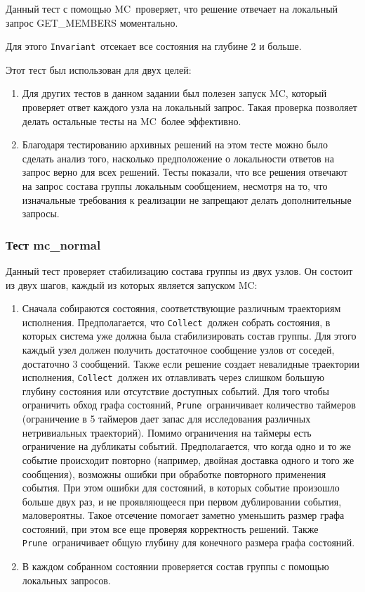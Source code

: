 \documentclass[a4paper,12pt]{extarticle}
\newcommand{\prune}[0]{\texttt{Prune}}
\newcommand{\invariant}[0]{\texttt{Invariant}}
\newcommand{\collect}[0]{\texttt{Collect}}
\newcommand{\mc}[0]{MC}
\begin{document}
Данный тест с помощью \mc\ проверяет, что решение отвечает на локальный запрос GET\_MEMBERS моментально.

Для этого \invariant\ отсекает все состояния на глубине 2 и больше.

Этот тест был использован для двух целей:
\begin{enumerate}
    \item Для других тестов в данном задании был полезен запуск \mc, который проверяет ответ каждого узла на локальный запрос.
Такая проверка позволяет делать остальные тесты на \mc\ более эффективно.
    \item Благодаря тестированию архивных решений на этом тесте можно было сделать анализ того, насколько предположение о локальности ответов на запрос верно для всех решений.
Тесты показали, что все решения отвечают на запрос состава группы локальным сообщением, несмотря на то, что изначальные требования к реализации не запрещают делать дополнительные запросы.
\end{enumerate}

\subsubsection{Тест mc\_normal}

Данный тест проверяет стабилизацию состава группы из двух узлов.
Он состоит из двух шагов, каждый из которых является запуском \mc:
\begin{enumerate}
    \item Сначала собираются состояния, соответствующие различным траекториям исполнения.
Предполагается, что \collect\ должен собрать состояния, в которых система уже должна была стабилизировать состав группы.
Для этого каждый узел должен получить достаточное сообщение узлов от соседей, достаточно 3 сообщений.
Также если решение создает невалидные траектории исполнения, \collect\ должен их отлавливать через слишком большую глубину состояния или отсутствие доступных событий.
Для того чтобы ограничить обход графа состояний, \prune\ ограничивает количество таймеров (ограничение в 5 таймеров дает запас для исследования различных нетривиальных траекторий).
Помимо ограничения на таймеры есть ограничение на дубликаты событий.
Предполагается, что когда одно и то же событие происходит повторно (например, двойная доставка одного и того же сообщения), возможны ошибки при обработке повторного применения события.
При этом ошибки для состояний, в которых событие произошло больше двух раз, и не проявляющееся при первом дублировании события, маловероятны.
Такое отсечение помогает заметно уменьшить размер графа состояний, при этом все еще проверяя корректность решений.
Также \prune\ ограничивает общую глубину для конечного размера графа состояний.
    \item В каждом собранном состоянии проверяется состав группы с помощью локальных запросов.
\end{enumerate}
\end{document}
